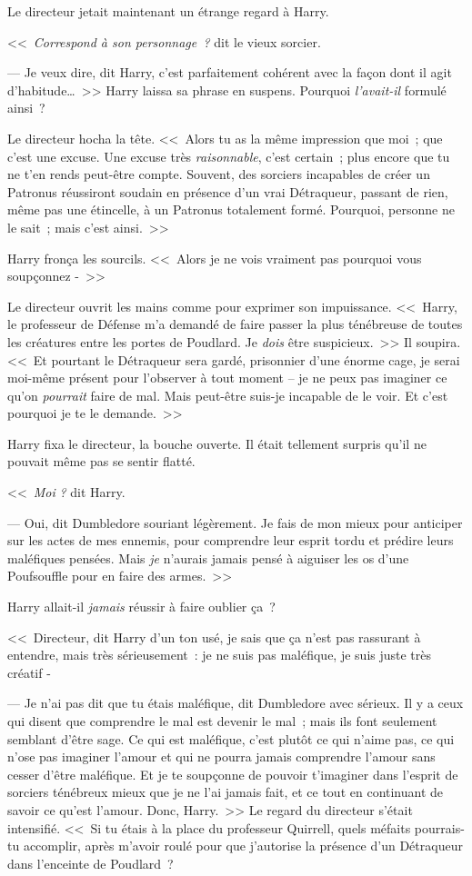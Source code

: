 Le directeur jetait maintenant un étrange regard à Harry.

<<~\emph{Correspond à son personnage~?} dit le vieux sorcier.

--- Je veux dire, dit Harry, c'est parfaitement cohérent avec la façon dont il agit d'habitude…~>> Harry laissa sa phrase en suspens. Pourquoi \emph{l'avait-il} formulé ainsi~?

Le directeur hocha la tête. <<~Alors tu as la même impression que moi~; que c'est une excuse. Une excuse très \emph{raisonnable}, c'est certain~; plus encore que tu ne t'en rends peut-être compte. Souvent, des sorciers incapables de créer un Patronus réussiront soudain en présence d'un vrai Détraqueur, passant de rien, même pas une étincelle, à un Patronus totalement formé. Pourquoi, personne ne le sait~; mais c'est ainsi.~>>

Harry fronça les sourcils. <<~Alors je ne vois vraiment pas pourquoi vous soupçonnez -~>>

Le directeur ouvrit les mains comme pour exprimer son impuissance. <<~Harry, le professeur de Défense m'a demandé de faire passer la plus ténébreuse de toutes les créatures entre les portes de Poudlard. Je \emph{dois} être suspicieux.~>> Il soupira. <<~Et pourtant le Détraqueur sera gardé, prisonnier d'une énorme cage, je serai moi-même présent pour l'observer à tout moment -- je ne peux pas imaginer ce qu'on \emph{pourrait} faire de mal. Mais peut-être suis-je incapable de le voir. Et c'est pourquoi je te le demande.~>>

Harry fixa le directeur, la bouche ouverte. Il était tellement surpris qu'il ne pouvait même pas se sentir flatté.

<<~\emph{Moi} \emph{?} dit Harry.

--- Oui, dit Dumbledore souriant légèrement. Je fais de mon mieux pour anticiper sur les actes de mes ennemis, pour comprendre leur esprit tordu et prédire leurs maléfiques pensées. Mais \emph{je} n'aurais jamais pensé à aiguiser les os d'une Poufsouffle pour en faire des armes.~>>

Harry allait-il \emph{jamais} réussir à faire oublier ça~?

<<~Directeur, dit Harry d'un ton usé, je sais que ça n'est pas rassurant à entendre, mais très sérieusement~: je ne suis pas maléfique, je suis juste très créatif -

--- Je n'ai pas dit que tu étais maléfique, dit Dumbledore avec sérieux. Il y a ceux qui disent que comprendre le mal est devenir le mal~; mais ils font seulement semblant d'être sage. Ce qui est maléfique, c'est plutôt ce qui n'aime pas, ce qui n'ose pas imaginer l'amour et qui ne pourra jamais comprendre l'amour sans cesser d'être maléfique. Et je te soupçonne de pouvoir t'imaginer dans l'esprit de sorciers ténébreux mieux que je ne l'ai jamais fait, et ce tout en continuant de savoir ce qu'est l'amour. Donc, Harry.~>> Le regard du directeur s'était intensifié. <<~Si tu étais à la place du professeur Quirrell, quels méfaits pourrais-tu accomplir, après m'avoir roulé pour que j'autorise la présence d'un Détraqueur dans l'enceinte de Poudlard~?

